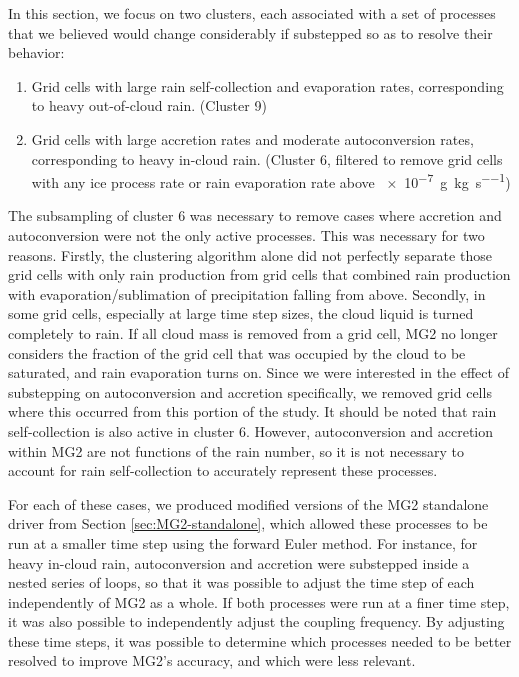 \documentclass [11pt, proquest] {uwthesis}[2020/02/24]
\begin{document}
In this section, we focus on two clusters, each associated with a set of processes that we believed would change considerably if substepped so as to resolve their behavior:

\begin{enumerate}
\item Grid cells with large rain self-collection and evaporation rates, corresponding to heavy out-of-cloud rain. (Cluster 9)
\item Grid cells with large accretion rates and moderate autoconversion rates, corresponding to heavy in-cloud rain. (Cluster 6, filtered to remove grid cells with any ice process rate or rain evaporation rate above \SI{e-7}{\gram\per\kilo\gram\per\second})
\end{enumerate}

The subsampling of cluster 6 was necessary to remove cases where accretion and autoconversion were not the only active processes. This was necessary for two reasons. Firstly, the clustering algorithm alone did not perfectly separate those grid cells with only rain production from grid cells that combined rain production with evaporation/sublimation of precipitation falling from above. Secondly, in some grid cells, especially at large time step sizes, the cloud liquid is turned completely to rain. If all cloud mass is removed from a grid cell, MG2 no longer considers the fraction of the grid cell that was occupied by the cloud to be saturated, and rain evaporation turns on. Since we were interested in the effect of substepping on autoconversion and accretion specifically, we removed grid cells where this occurred from this portion of the study. It should be noted that rain self-collection is also active in cluster 6. However, autoconversion and accretion within MG2 are not functions of the rain number, so it is not necessary to account for rain self-collection to accurately represent these processes.

For each of these cases, we produced modified versions of the MG2 standalone driver from Section \ref{sec:MG2-standalone}, which allowed these processes to be run at a smaller time step using the forward Euler method. For instance, for heavy in-cloud rain, autoconversion and accretion were substepped inside a nested series of loops, so that it was possible to adjust the time step of each independently of MG2 as a whole. If both processes were run at a finer time step, it was also possible to independently adjust the coupling frequency. By adjusting these time steps, it was possible to determine which processes needed to be better resolved to improve MG2's accuracy, and which were less relevant.
\end{document}
